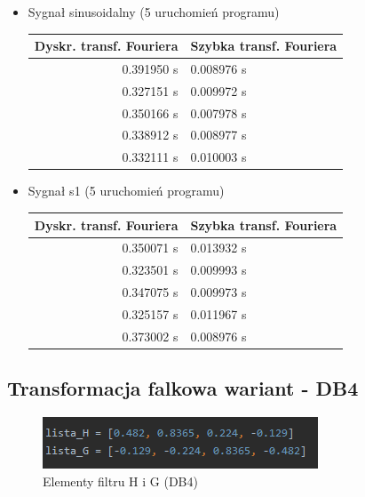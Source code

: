 \documentclass[12pt]{article}
\begin{document}
\begin{itemize}
\item Sygnał sinusoidalny (5 uruchomień programu)


\begin{tabular}{|r|l|}
  \hline 
  Dyskr. transf. Fouriera & Szybka transf. Fouriera \\
  \hline
  0.391950 s & 0.008976 s \\
  \hline
  0.327151 s &  0.009972 s \\
  \hline
  0.350166 s & 0.007978 s \\
  \hline
  0.338912 s &0.008977 s \\
  \hline
  0.332111 s & 0.010003 s \\
  \hline
\end{tabular} 

\item Sygnał s1 (5 uruchomień programu)

\begin{tabular}{|r|l|}
  \hline 
  Dyskr. transf. Fouriera & Szybka transf. Fouriera \\
  \hline
  0.350071 s & 0.013932 s \\
  \hline
  0.323501 s & 0.009993 s \\
  \hline
  0.347075 s &0.009973 s \\
  \hline
  0.325157 s & 0.011967 s \\
  \hline
   0.373002 s & 0.008976 s \\
  \hline
\end{tabular} 

\end{itemize}

\subsection{Transformacja falkowa wariant - DB4}
\begin{figure}[H]
\centering
\includegraphics[scale=0.99]{listaHG.png}
\caption{Elementy filtru H i G (DB4)}
\end{figure}
\end{document}
